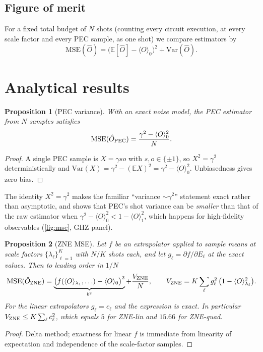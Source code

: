 \documentclass[11pt,a4paper]{article}
\newtheorem{proposition}{Proposition}
\theoremstyle{remark}
\newcommand{\E}{\mathbb{E}}
\newcommand{\Var}{\mathrm{Var}}
\newcommand{\MSE}{\mathrm{MSE}}
\begin{document}
\subsection{Figure of merit}

For a fixed total budget of $N$ shots (counting every circuit execution, at every scale factor and every PEC sample, as one shot) we compare estimators by
\begin{equation}
\MSE(\hat O) = \big(\E[\hat O]-\langle O\rangle_0\big)^2+\Var(\hat O) .
\end{equation}

\section{Analytical results}
\label{sec:theory}

\begin{proposition}[PEC variance]
\label{prop:pec}
With an exact noise model, the PEC estimator from $N$ samples satisfies
\begin{equation}
\MSE(\hat O_{\rm PEC}) = \frac{\gamma^2-\langle O\rangle_0^2}{N}.
\end{equation}
\end{proposition}
\begin{proof}
A single PEC sample is $X=\gamma s o$ with $s,o\in\{\pm1\}$, so $X^2=\gamma^2$ deterministically and $\Var(X)=\gamma^2-(\E X)^2=\gamma^2-\langle O\rangle_0^2$. Unbiasedness gives zero bias.
\end{proof}
The identity $X^2=\gamma^2$ makes the familiar ``variance $\sim\gamma^2$'' statement exact rather than asymptotic, and shows that PEC's shot variance can be \emph{smaller} than that of the raw estimator when $\gamma^2-\langle O\rangle_0^2 < 1-\langle O\rangle_1^2$, which happens for high-fidelity observables (\cref{fig:mse}, GHZ panel).

\begin{proposition}[ZNE MSE]
\label{prop:zne}
Let $f$ be an extrapolator applied to sample means at scale factors $\{\lambda_\ell\}_{\ell=1}^K$ with $N/K$ shots each, and let $g_\ell=\partial f/\partial E_\ell$ at the exact values. Then to leading order in $1/N$
\begin{equation}
\MSE(\hat O_{\rm ZNE}) = \underbrace{\big(f(\langle O\rangle_{\lambda_1},\ldots)-\langle O\rangle_0\big)^2}_{b^2}
+\frac{V_{\rm ZNE}}{N},\qquad
V_{\rm ZNE} = K\sum_{\ell} g_\ell^2\,\big(1-\langle O\rangle_{\lambda_\ell}^2\big).
\label{eq:znemse}
\end{equation}
For the linear extrapolators $g_\ell=c_\ell$ and the expression is exact. In particular $V_{\rm ZNE}\le K\sum_\ell c_\ell^2$, which equals $5$ for ZNE-lin and $15.66$ for ZNE-quad.
\end{proposition}
\begin{proof}
Delta method; exactness for linear $f$ is immediate from linearity of expectation and independence of the scale-factor samples.
\end{proof}
\end{document}
